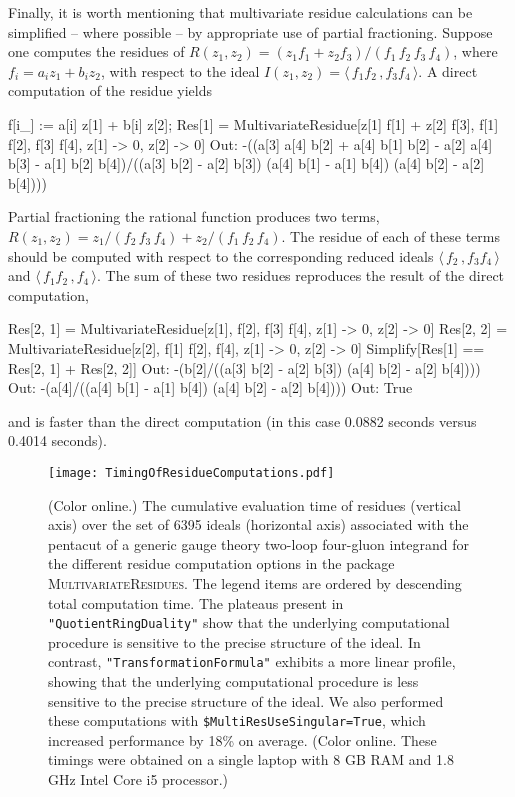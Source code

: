 \documentclass[dvipsnames,preprint,12pt,sort&compress]{elsarticle}
\newcommand{\Math}[1]
{\lstinline[style=Mathematica,breaklines=false,basicstyle=\small \ttfamily\null]~#1~}
\begin{document}
Finally, it is worth mentioning that multivariate residue calculations can be simplified -- where possible -- by appropriate use of partial fractioning.
Suppose one computes the residues of $R(z_1,z_2) = (z_1 f_1+ z_2 f_3)/(f_1\,f_2\,f_3\,f_4)$, where $f_i = a_i z_1 + b_i z_2$, with respect to the ideal $I(z_1,z_2) = \langle \, f_1 f_2 \,, f_3 f_4\, \rangle$.
A direct computation of the residue yields
\begin{CodeSample}
f[i_] := a[i] z[1] + b[i] z[2];
Res[1] = MultivariateResidue[z[1] f[1] + z[2] f[3], {f[1] f[2], f[3] f[4]}, {z[1] -> 0, z[2] -> 0}]
Out: -((a[3] a[4] b[2] + a[4] b[1] b[2] - a[2] a[4] b[3] - a[1] b[2] b[4])/((a[3] b[2] - a[2] b[3]) (a[4] b[1] - a[1] b[4]) (a[4] b[2] - a[2] b[4])))
\end{CodeSample}
Partial fractioning the rational function produces two terms, $R(z_1,z_2) = z_1/(f_2\,f_3\,f_4) + z_2/(f_1\,f_2\,f_4)$. The residue of each of these terms should be computed with respect to the corresponding reduced ideals $\langle \, f_2 \,, f_3 f_4 \, \rangle$ and $\langle \, f_1 f_2 \,, f_4 \, \rangle$.
The sum of these two residues reproduces the result of the direct computation,

\begin{CodeSample}
Res[2, 1] = MultivariateResidue[z[1], {f[2], f[3] f[4]}, {z[1] -> 0, z[2] -> 0}]
Res[2, 2] = MultivariateResidue[z[2], {f[1] f[2], f[4]}, {z[1] -> 0, z[2] -> 0}]
Simplify[Res[1] == Res[2, 1] + Res[2, 2]]
Out: -(b[2]/((a[3] b[2] - a[2] b[3]) (a[4] b[2] - a[2] b[4])))
Out: -(a[4]/((a[4] b[1] - a[1] b[4]) (a[4] b[2] - a[2] b[4])))
Out: True
\end{CodeSample}
and is faster than the direct computation (in this case 0.0882 seconds versus 0.4014 seconds).

\vspace{2mm}

\begin{figure}[!h]
\texttt{[image: TimingOfResidueComputations.pdf]}
\caption{
(Color online.) The cumulative evaluation time of residues (vertical axis) over the set of 6395 ideals (horizontal axis) associated with the pentacut of a generic gauge theory two-loop four-gluon integrand for the different residue computation options in the package \textsc{MultivariateResidues}.
The legend items are ordered by descending total computation time.
The plateaus present in \Math{"QuotientRingDuality"} show that the underlying computational procedure is sensitive to the precise structure of the ideal.
In contrast, \Math{"TransformationFormula"} exhibits a more linear profile, showing that the underlying computational procedure is less sensitive to the precise structure of the ideal.
We also performed these computations with \Math{$MultiResUseSingular=True}, which increased performance by 18\% on average.
(Color online. These timings were obtained on a single laptop with 8 GB RAM and 1.8 GHz Intel Core i5 processor.)}
\label{fig:CutTwoLoopIntegrandEvaluationTimes}
\end{figure}
\end{document}
